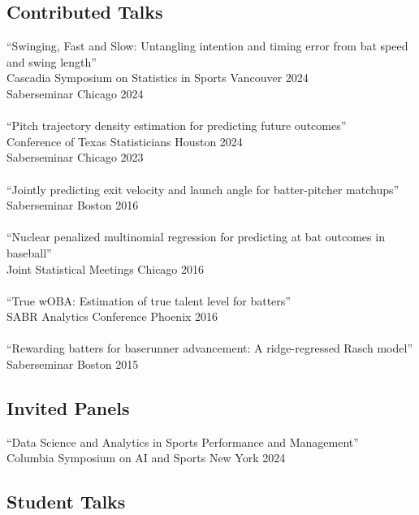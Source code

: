 \documentclass{article}
\begin{document}
\subsection*{\sc Contributed Talks}

``Swinging, Fast and Slow: Untangling intention and timing error from bat speed and swing length''\\
Cascadia Symposium on Statistics in Sports \hfill Vancouver 2024\\
Saberseminar \hfill Chicago 2024\\
~\\
``Pitch trajectory density estimation for predicting future outcomes''\\
Conference of Texas Statisticians \hfill Houston 2024\\
Saberseminar \hfill Chicago 2023\\
~\\
``Jointly predicting exit velocity and launch angle for batter-pitcher matchups''\\
Saberseminar \hfill Boston 2016\\
~\\
``Nuclear penalized multinomial regression for predicting at bat outcomes in baseball''\\
Joint Statistical Meetings \hfill Chicago 2016\\
~\\
``True wOBA: Estimation of true talent level for batters''\\
SABR Analytics Conference \hfill Phoenix 2016\\
~\\
``Rewarding batters for baserunner advancement: A ridge-regressed Rasch model''\\
Saberseminar \hfill Boston 2015

\subsection*{\sc Invited Panels}

``Data Science and Analytics in Sports Performance and Management''\\
Columbia Symposium on AI and Sports \hfill New York 2024

\subsection*{\sc Student Talks}
\end{document}
